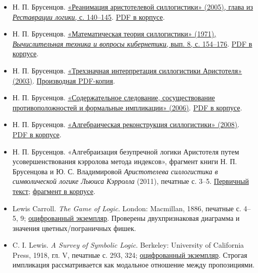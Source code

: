 \documentclass[12pt,a4paper]{article}
\begin{document}
\begin{itemize}
\item Н. П. Брусенцов. \href{https://ternarycomp.cs.msu.ru/Papers/Rea.pdf}{«Реанимация аристотелевой силлогистики» (2005), глава из \emph{Реставрации логики}, с. 140–145}. \href{../sources/pdfs/Брусенцов_Реанимация-аристотелевой-силлогистики_2005-глава-из-Реставрации-логики.pdf}{PDF в корпусе}.
\item Н. П. Брусенцов. \href{https://www.computer-museum.ru/books/setun/brusencov_03.pdf}{«Математическая теория силлогистики» (1971), \emph{Вычислительная техника и вопросы кибернетики}, вып. 8, с. 154–176}. \href{../sources/pdfs/Брусенцов_Математическая-теория-силлогистики_1971.pdf}{PDF в корпусе}.
\item Н. П. Брусенцов. \href{https://computer-museum.ru/histussr/trilog0.htm}{«Трехзначная интерпретация силлогистики Аристотеля» (2003)}. \href{../sources/pdfs/Брусенцов_Трехзначная-интерпретация-силлогистики-Аристотеля_2003_версия-музея.pdf}{Производная PDF-копия}.
\item Н. П. Брусенцов. \href{https://ternarycomp.cs.msu.ru/Papers/Soder_sled.pdf}{«Содержательное следование, сосуществование противоположностей и формальные импликации» (2006)}. \href{../sources/pdfs/Брусенцов_Содержательное-следование-и-формальные-импликации_2006.pdf}{PDF в корпусе}.
\item Н. П. Брусенцов. \href{https://ternarycomp.cs.msu.ru/Papers/Alrek.pdf}{«Алгебраическая реконструкция силлогистики» (2008)}. \href{../sources/pdfs/Брусенцов_Алгебраическая-реконструкция-силлогистики_2008.pdf}{PDF в корпусе}.
\item Н. П. Брусенцов. «Алгебраизация безупречной логики Аристотеля путем усовершенствования кэрролова метода индексов», фрагмент книги Н. П. Брусенцова и Ю. С. Владимировой \emph{Аристотелева силлогистика в символической логике Льюиса Кэрролла} (2011), печатные с. 3–5. \href{https://ternarycomp.cs.msu.ru/Papers/brusentsov_algebraiz_2011.pdf}{Первичный текст}; \href{../sources/pdfs/Брусенцов_Владимирова_Алгебраизация-силлогистики-методом-Кэрролла_2011.pdf}{фрагмент в корпусе}.
\item Lewis Carroll. \emph{The Game of Logic}. London: Macmillan, 1886, печатные с. 4–5, 9; \href{https://archive.org/details/gameoflogic00carrrich}{оцифрованный экземпляр}. Проверены двухпризнаковая диаграмма и значения цветных/пограничных фишек.
\item C. I. Lewis. \emph{A Survey of Symbolic Logic}. Berkeley: University of California Press, 1918, гл. V, печатные с. 293, 324; \href{https://archive.org/details/surveyofsymbolic00lewiiala}{оцифрованный экземпляр}. Строгая импликация рассматривается как модальное отношение между пропозициями.

\end{itemize}
\end{document}
